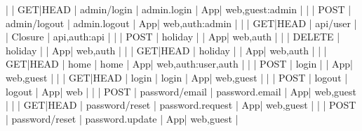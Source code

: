 |        | GET|HEAD | admin/login                   | admin.login           | App\Http\Controllers\Admin\Auth\LoginController@showLoginForm          | web,guest:admin                                      |
|        | POST     | admin/logout                  | admin.logout          | App\Http\Controllers\Admin\Auth\LoginController@logout                 | web,auth:admin                                       |
|        | GET|HEAD | api/user                      |                       | Closure                                                                | api,auth:api                                         |
|        | POST     | holiday                       |                       | App\Http\Controllers\HolidayController@store                           | web,auth                                             |
|        | DELETE   | holiday                       |                       | App\Http\Controllers\HolidayController@destroy                         | web,auth                                             |
|        | GET|HEAD | holiday                       |                       | App\Http\Controllers\HolidayController@create                          | web,auth                                             |
|        | GET|HEAD | home                          | home                  | App\Http\Controllers\HomeController@index                              | web,auth:user,auth                                   |
|        | POST     | login                         |                       | App\Http\Controllers\Auth\LoginController@login                        | web,guest                                            |
|        | GET|HEAD | login                         | login                 | App\Http\Controllers\Auth\LoginController@showLoginForm                | web,guest                                            |
|        | POST     | logout                        | logout                | App\Http\Controllers\Auth\LoginController@logout                       | web                                                  |
|        | POST     | password/email                | password.email        | App\Http\Controllers\Auth\ForgotPasswordController@sendResetLinkEmail  | web,guest                                            |
|        | GET|HEAD | password/reset                | password.request      | App\Http\Controllers\Auth\ForgotPasswordController@showLinkRequestForm | web,guest                                            |
|        | POST     | password/reset                | password.update       | App\Http\Controllers\Auth\ResetPasswordController@reset                | web,guest                                            |
